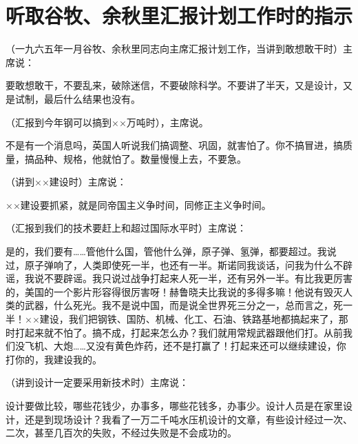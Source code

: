 \section[听取谷牧、余秋里汇报计划工作时的指示（一九六五年一月）]{听取谷牧、余秋里汇报计划工作时的指示}


（一九六五年一月谷牧、余秋里同志向主席汇报计划工作，当讲到敢想敢干时）主席说：

要敢想敢干，不要乱来，破除迷信，不要破除科学。不要讲了半天，又是设计，又是试制，最后什么结果也没有。

（汇报到今年钢可以搞到××万吨时），主席说。

不是有一个消息吗，英国人听说我们搞调整、巩固，就害怕了。你不搞冒进，搞质量，搞品种、规格，他就怕了。数量慢慢上去，不要急。

（讲到××建设时）主席说：

××建设要抓紧，就是同帝国主义争时间，同修正主义争时间。

（汇报到我们的技术要赶上和超过国际水平时）主席说：

是的，我们要有……管他什么国，管他什么弹，原子弹、氢弹，都要超过。我说过，原子弹响了，人类即使死一半，也还有一半。斯诺同我谈话，问我为什么不辟谣，我说不要辟谣。我只说过战争打起来人死一半，还有另外一半。有比我更厉害的，美国的一个影片形容得很厉害呀！赫鲁晓夫比我说的多得多嘛！他说有毁灭人类的武器，什么死光。我不是说中国，而是说全世界死三分之一，总而言之，死一半！××建设，我们把钢铁、国防、机械、化工、石油、铁路基地都搞起来了，那时打起来就不怕了。搞不成，打起来怎么办？我们就用常规武器跟他们打。从前我们没飞机、大炮……又没有黄色炸药，还不是打赢了！打起来还可以继续建设，你打你的，我建设我的。

（讲到设计一定要采用新技术时）主席说：

设计要做比较，哪些花钱少，办事多，哪些花钱多，办事少。设计人员是在家里设计，还是到现场设计？我看了一万二千吨水压机设计的文章，有些设计经过一次、二次，甚至几百次的失败，不经过失败是不会成功的。



